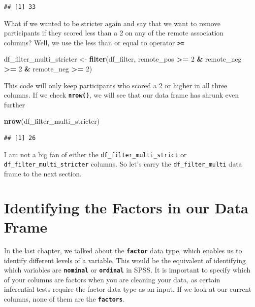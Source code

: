 \documentclass[
]{book}
\newenvironment{Shaded}{\begin{snugshade}}{\end{snugshade}}
\newcommand{\DecValTok}[1]{\textcolor[rgb]{0.00,0.00,0.81}{#1}}
\newcommand{\FunctionTok}[1]{\textcolor[rgb]{0.13,0.29,0.53}{\textbf{#1}}}
\newcommand{\NormalTok}[1]{#1}
\newcommand{\OtherTok}[1]{\textcolor[rgb]{0.56,0.35,0.01}{#1}}
\newcommand{\SpecialCharTok}[1]{\textcolor[rgb]{0.81,0.36,0.00}{\textbf{#1}}}
\begin{document}
\begin{verbatim}
## [1] 33
\end{verbatim}

What if we wanted to be stricter again and say that we want to remove participants if they scored less than a 2 on any of the remote association columns? Well, we use the less than or equal to operator \textbf{\texttt{\textgreater{}=}}

\begin{Shaded}
\begin{Highlighting}[]
\NormalTok{df\_filter\_multi\_stricter }\OtherTok{\textless{}{-}} \FunctionTok{filter}\NormalTok{(df\_filter, remote\_pos }\SpecialCharTok{\textgreater{}=} \DecValTok{2} \SpecialCharTok{\&}\NormalTok{ remote\_neg }\SpecialCharTok{\textgreater{}=} \DecValTok{2} \SpecialCharTok{\&}\NormalTok{ remote\_neg }\SpecialCharTok{\textgreater{}=} \DecValTok{2}\NormalTok{)}
\end{Highlighting}
\end{Shaded}

This code will only keep participants who scored a 2 or higher in all three columns. If we check \textbf{\texttt{nrow()}}, we will see that our data frame has shrunk even further

\begin{Shaded}
\begin{Highlighting}[]
\FunctionTok{nrow}\NormalTok{(df\_filter\_multi\_stricter)}
\end{Highlighting}
\end{Shaded}

\begin{verbatim}
## [1] 26
\end{verbatim}

I am not a big fan of either the \texttt{df\_filter\_multi\_strict} or \texttt{df\_filter\_multi\_stricter} columns. So let's carry the \texttt{df\_filter\_multi} data frame to the next section.

\hypertarget{identifying-the-factors-in-our-data-frame}{%
\section{Identifying the Factors in our Data Frame}\label{identifying-the-factors-in-our-data-frame}}

In the last chapter, we talked about the \textbf{\texttt{factor}} data type, which enables us to identify different levels of a variable. This would be the equivalent of identifying which variables are \textbf{\texttt{nominal}} or \textbf{\texttt{ordinal}} in SPSS. It is important to specify which of your columns are factors when you are cleaning your data, as certain inferential tests require the factor data type as an input. If we look at our current columns, none of them are the \textbf{\texttt{factors}}.
\end{document}
